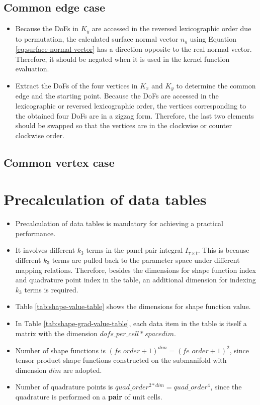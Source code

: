 \documentclass[11pt, a4paper]{book}
\begin{document}
\subsection{Common edge case}

\begin{itemize}
\item Because the DoFs in $K_y$ are accessed in the reversed lexicographic order due to permutation,
  the calculated surface normal vector $n_y$ using Equation \eqref{eq:surface-normal-vector} has a
  direction opposite to the real normal vector. Therefore, it should be negated when it is used in
  the kernel function evaluation.
\item Extract the DoFs of the four vertices in $K_x$ and $K_y$ to determine the common edge and the
  starting point. Because the DoFs are accessed in the lexicographic or reversed lexicographic
  order, the vertices corresponding to the obtained four DoFs are in a zigzag form. Therefore, the
  last two elements should be swapped so that the vertices are in the clockwise or counter clockwise
  order.
\end{itemize}

\subsection{Common vertex case}

\section{Precalculation of data tables}

\begin{itemize}
\item Precalculation of data tables is mandatory for achieving a practical performance.
\item It involves different $k_3$ terms in the panel pair integral $I_{\tau\times t}$. This is
  because different $k_3$ terms are pulled back to the parameter space under different mapping
  relations. Therefore, besides the dimensions for shape function index and quadrature point index
  in the table, an additional dimension for indexing $k_3$ terms is required.
\item Table \ref{tab:shape-value-table} shows the dimensions for shape function value.
\item In Table \ref{tab:shape-grad-value-table}, each data item in the table is itself a matrix with
  the dimension $dofs\_per\_cell*spacedim$.
\item Number of shape functions is $(fe\_order+1)^{dim}=(fe\_order+1)^{2}$, since tensor product shape functions
  constructed on the submanifold with dimension $dim$ are adopted.
\item Number of quadrature points is $quad\_order^{2*dim}=quad\_order^{4}$, since the quadrature is
  performed on a \textbf{pair} of unit cells.
\end{itemize}
\end{document}
